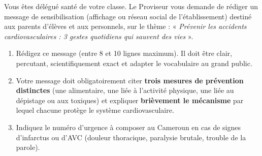 \documentclass[11pt]{article}
\begin{document}
\begin{exercice}
Vous êtes délégué santé de votre classe. Le Proviseur vous demande de rédiger un message de sensibilisation (affichage ou réseau social de l'établissement) destiné aux parents d'élèves et aux personnels, sur le thème : « \emph{Prévenir les accidents cardiovasculaires : 3 gestes quotidiens qui sauvent des vies} ».
\begin{enumerate}
    \item Rédigez ce message (entre 8 et 10 lignes maximum). Il doit être clair, percutant, scientifiquement exact et adapter le vocabulaire au grand public.
    \item Votre message doit obligatoirement citer \textbf{trois mesures de prévention distinctes} (une alimentaire, une liée à l'activité physique, une liée au dépistage ou aux toxiques) et expliquer \textbf{brièvement le mécanisme} par lequel chacune protège le système cardiovasculaire.
    \item Indiquez le numéro d'urgence à composer au Cameroun en cas de signes d'infarctus ou d'AVC (douleur thoracique, paralysie brutale, trouble de la parole).
\end{enumerate}
\end{exercice}
\end{document}
